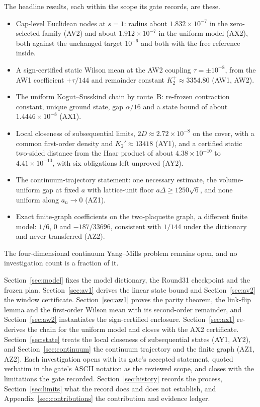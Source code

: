 \documentclass[11pt,a4paper]{article}
\begin{document}
The headline results, each within the scope its gate records, are these.
\begin{itemize}
\item Cap-level Euclidean nodes at $s=1$: radius about $1.832\times10^{-7}$
 in the zero-selected family (AV2) and about $1.912\times10^{-7}$ in the
 uniform model (AX2), both against the unchanged target $10^{-6}$ and both
 with the free reference inside.
\item A sign-certified static Wilson mean at the AW2 coupling
 $\tau=\pm10^{-8}$, from the AW1 coefficient $+\tau/144$ and remainder
 constant $K_2^+\approx3354.80$ (AW1, AW2).
\item The uniform Kogut--Susskind chain by route~B: re-frozen contraction
 constant, unique ground state, gap $\alpha/16$ and a state bound of about
 $1.4446\times10^{-8}$ (AX1).
\item Local closeness of subsequential limits, $2D\approx2.72\times10^{-8}$ on
 the cover, with a common first-order density and $K_2'\approx13418$ (AY1),
 and a certified static two-sided distance from the Haar product of about
 $4.38\times10^{-10}$ to $4.41\times10^{-10}$, with six obligations left
 unproved (AY2).
\item The continuum-trajectory statement: one necessary estimate, the
 volume-uniform gap at fixed $a$ with lattice-unit floor
 $a\Delta\ge1250\sqrt6$, and none uniform along $a_n\to0$ (AZ1).
\item Exact finite-graph coefficients on the two-plaquette graph, a different
 finite model: $1/6$, $0$ and $-187/33696$, consistent with $1/144$ under the
 dictionary and never transferred (AZ2).
\end{itemize}
The four-dimensional continuum Yang--Mills problem remains open, and no
investigation count is a fraction of it.

Section~\ref{sec:model} fixes the model dictionary, the Round31 checkpoint and
the frozen plan. Section~\ref{sec:av1} derives the linear state bound and
Section~\ref{sec:av2} the window certificate. Section~\ref{sec:aw1} proves the
parity theorem, the link-flip lemma and the first-order Wilson mean with its
second-order remainder, and Section~\ref{sec:aw2} instantiates the
sign-certified enclosure. Section~\ref{sec:ax1} re-derives the chain for the
uniform model and closes with the AX2 certificate. Section~\ref{sec:state}
treats the local closeness of subsequential states (AY1, AY2), and
Section~\ref{sec:continuum} the continuum trajectory and the finite graph
(AZ1, AZ2). Each investigation opens with its gate's accepted statement,
quoted verbatim in the gate's ASCII notation as the reviewed scope, and
closes with the limitations the gate recorded. Section~\ref{sec:history}
records the process, Section~\ref{sec:limits} what the record does and does
not establish, and Appendix~\ref{sec:contributions} the contribution and
evidence ledger.
\end{document}
